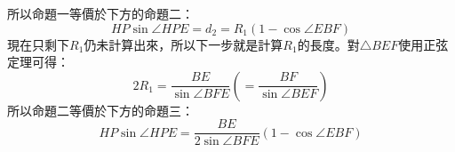 \begin{center}
\end{center}
所以命題一等價於下方的命題二：
\begin{equation}
  HP\sin{\angle{HPE}}=d_2=R_1\left(1-\cos{\angle{EBF}}\right)
\end{equation}
現在只剩下$R_1$仍未計算出來，所以下一步就是計算$R_1$的長度。對$\triangle{BEF}$使用正弦定理可得：
\begin{equation}
  2R_1=\frac{BE}{\sin{\angle{BFE}}}\left(=\frac{BF}{\sin{\angle{BEF}}}\right)
\end{equation}
所以命題二等價於下方的命題三：
\begin{equation}
  HP\sin{\angle{HPE}}=\frac{BE}{2\sin{\angle{BFE}}}\left(1-\cos{\angle{EBF}}\right)
\end{equation}

